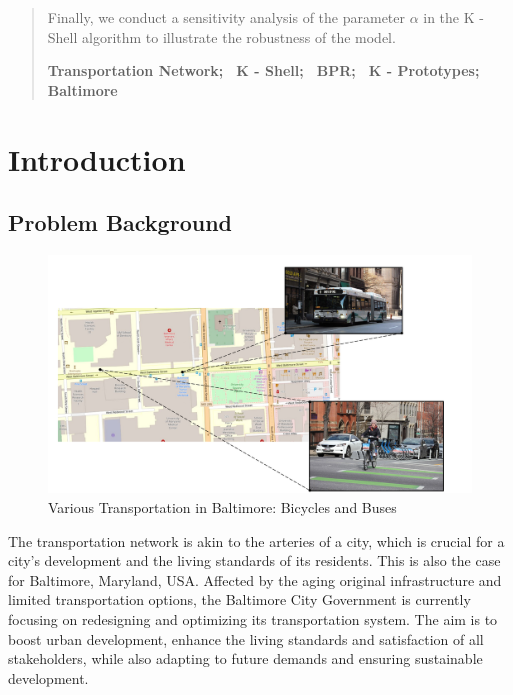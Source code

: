 \documentclass{mcmthesis}
\begin{document}
\begin{abstract}
    Finally, we conduct a sensitivity analysis of the parameter $\alpha$ in the K - Shell algorithm to illustrate the robustness of the model.

\begin{keywords}
\textbf{Transportation Network; \, K - Shell; \, BPR; \, K - Prototypes; \, Baltimore}
\end{keywords}
\end{abstract}
\maketitle
\tableofcontents
\newpage

\section{Introduction}

\subsection{Problem Background}

\begin{figure}[H]
    \centering
    \includegraphics[width=\textwidth]{figures/intro.pdf}
    \caption{Various Transportation in Baltimore: Bicycles and Buses}
    \label{fig:intro}
\end{figure}

The transportation network is akin to the arteries of a city, which is crucial for a city's development and the living standards of its residents. This is also the case for Baltimore, Maryland, USA. Affected by the aging original infrastructure and limited transportation options, the Baltimore City Government is currently focusing on redesigning and optimizing its transportation system. The aim is to boost urban development, enhance the living standards and satisfaction of all stakeholders, while also adapting to future demands and ensuring sustainable development.
\end{document}
